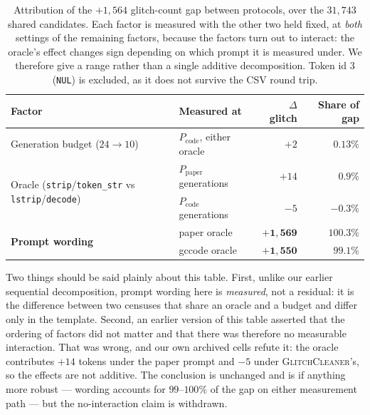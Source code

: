 \documentclass[11pt,a4paper]{article}
\newcommand{\gc}{\textsc{GlitchCleaner}}
\newcommand{\Ppaper}{$P_{\mathrm{paper}}$}
\newcommand{\Pcode}{$P_{\mathrm{code}}$}
\begin{document}
\begin{table}[h]
\centering
\caption{Attribution of the $+1{,}564$ glitch-count gap between protocols, over the
$31{,}743$ shared candidates. Each factor is measured with the other two held
fixed, at \emph{both} settings of the remaining factors, because the factors turn
out to interact: the oracle's effect changes sign depending on which prompt it is
measured under. We therefore give a range rather than a single additive
decomposition. Token id $3$ (\texttt{NUL}) is excluded, as it does not survive the
CSV round trip.}
\label{tab:factorial}
\begin{tabular}{llrr}
\toprule
Factor & Measured at & $\Delta$ glitch & Share of gap \\
\midrule
Generation budget ($24 \rightarrow 10$) & \Pcode{}, either oracle & $+2$ & $0.13\%$ \\
\midrule
\multirow{2}{*}{Oracle (\texttt{strip}/\texttt{token\_str} vs \texttt{lstrip}/\texttt{decode})}
  & \Ppaper{} generations & $+14$ & $0.9\%$ \\
  & \Pcode{} generations  & $-5$  & $-0.3\%$ \\
\midrule
\multirow{2}{*}{\textbf{Prompt wording}}
  & paper oracle  & $\mathbf{+1{,}569}$ & $\mathbf{100.3\%}$ \\
  & gccode oracle & $\mathbf{+1{,}550}$ & $\mathbf{99.1\%}$ \\
\bottomrule
\end{tabular}
\end{table}

Two things should be said plainly about this table. First, unlike our earlier
sequential decomposition, prompt wording here is \emph{measured}, not a residual:
it is the difference between two censuses that share an oracle and a budget and
differ only in the template. Second, an earlier version of this table asserted
that the ordering of factors did not matter and that there was therefore no
measurable interaction. That was wrong, and our own archived cells refute it: the
oracle contributes $+14$ tokens under the paper prompt and $-5$ under \gc{}'s, so
the effects are not additive. The conclusion is unchanged and is if anything more
robust --- wording accounts for $99$--$100\%$ of the gap on either measurement path
--- but the no-interaction claim is withdrawn.
\end{document}
